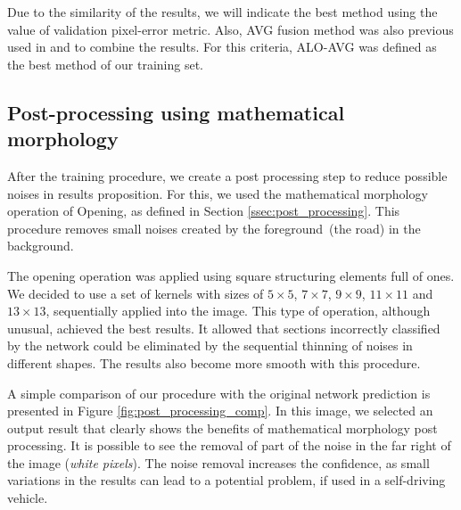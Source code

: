 Due to the similarity of the results, we will indicate the best method using the value of validation pixel-error metric. Also, AVG fusion method was also previous used in \cite{xie2015} and \cite{liu2017} to combine the results. For this criteria, ALO-AVG was defined as the best method of our training set.

\subsection{Post-processing using mathematical morphology}


After the training procedure, we create a post processing step to reduce possible noises in results proposition. For this, we used the mathematical morphology operation of Opening, as defined in Section \ref{ssec:post_processing}. This procedure removes small noises created by the foreground~(the road) in the background. 

The opening operation was applied using square structuring elements full of ones. We decided to use a set of kernels with sizes of $5\times5$, $7\times7$, $9\times9$, $11\times11$ and $13\times13$, sequentially applied into the image. This type of operation, although unusual, achieved the best results. It allowed that sections incorrectly classified by the network could be eliminated by the sequential thinning of noises in different shapes. The results also become more smooth with this procedure.


A simple comparison of our procedure with the original network prediction is presented in Figure \ref{fig:post_processing_comp}. In this image, we selected an output result that clearly shows the benefits of mathematical morphology post processing. It is possible to see the removal of part of the noise in the far right of the image (\textit{white pixels}). The noise removal increases the confidence, as small variations in the results can lead to a potential problem, if used in a self-driving vehicle. 

